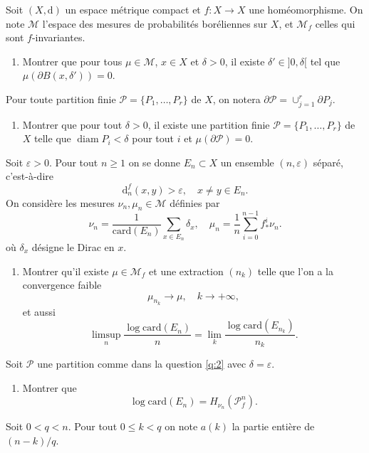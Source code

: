 \documentclass[a4paper,12pt,openany]{article}
\theoremstyle{plain}
\theoremstyle{definition}
\newcommand{\dd}{\mathrm{d}}
\newcommand{\Pcal}{\mathcal{P}}
\newcommand{\Mcal}{\mathcal{M}}
\DeclareMathOperator{\diam}{diam}
\begin{document}
\vspace{0.6cm}


\noindent Soit $(X, \dd)$ un espace m\'etrique compact et $f : X \to X$ une hom\'eomorphisme. On note $\mathcal{M}$ l'espace des mesures de probabilit\'es bor\'eliennes sur $X$, et $\mathcal{M}_f$ celles qui sont $f$-invariantes.

\begin{enumerate}[resume]
\item Montrer que pour tous $\mu \in \mathcal{M}$, $x \in X$ et $\delta > 0$, il existe $\delta' \in ]0, \delta[$ tel que $\mu(\partial B(x,\delta')) = 0$.
\end{enumerate}
Pour toute partition finie $\Pcal= \{P_1, \dots, P_r\}$ de $X$, on notera $\partial \Pcal = \cup_{j=1}^r \partial P_j.$
\begin{enumerate}[resume]
\item \label{q:2} Montrer que pour tout $\delta > 0$, il existe une partition finie $\Pcal = \{P_1, \dots, P_r\}$ de $X$ telle que 
$
\diam P_i < \delta 
$
pour tout $i$ et $\mu(\partial \Pcal) = 0.$
\end{enumerate}
Soit $\varepsilon > 0$. Pour tout $n \geqslant 1$ on se donne $E_n  \subset X$ un ensemble $(n,\varepsilon)$ s\'epar\'e, c'est-\`a-dire
$$
\dd^f_n(x, y) > \varepsilon, \quad x \neq y \in E_n.
$$
On consid\`ere les mesures $\nu_n, \mu_n \in \Mcal$ d\'efinies par
$$
\nu_n = \frac{1}{\mathrm{card}(E_n)} \sum_{x \in E_n} \delta_x, \quad \mu_n = \frac{1}{n} \sum_{i=0}^{n-1} f^i_* \nu_n.
$$
o\`u $\delta_x$ d\'esigne le Dirac en $x$.
\begin{enumerate}[resume]
\item Montrer qu'il existe $\mu \in \Mcal_f$ et une extraction $(n_k)$ telle que l'on a la convergence faible
$$
\mu_{n_k} \to \mu, \quad k \to +\infty,
$$
et aussi
$$
\limsup_n \frac{\log \mathrm{card}(E_n)}{n} = \lim_k  \frac{\log \mathrm{card}(E_{n_k})}{n_k}.
$$
\end{enumerate}
Soit $\Pcal$ une partition comme dans la question \ref{q:2} avec $\delta = \varepsilon.$
 \begin{enumerate}[resume]
\item Montrer que 
$$
\log \mathrm{card}(E_n) = H_{\nu_n}(\Pcal_f^n).
$$
\end{enumerate}
Soit $0 < q < n$. Pour tout $ 0 \leqslant k < q$ on note $a(k)$ la partie enti\`ere de $(n-k) / q$.
\end{document}
